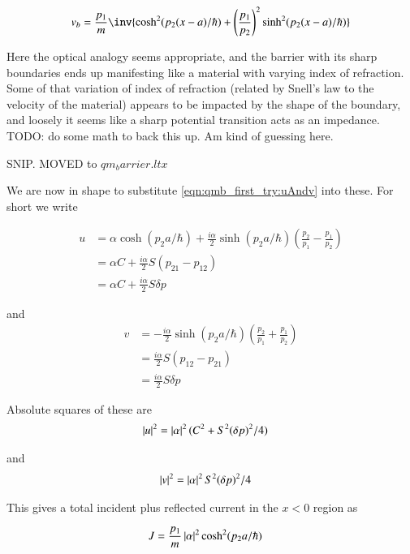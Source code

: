 \begin{align*}
v_b = \frac{p_1}{m} \inv{
\cosh^2(p_2(x-a)/\hbar)
 + 
 {\left(\frac{p_1}{p_2}\right)}^2
\sinh^2(p_2(x-a)/\hbar)
 } \\
\end{align*}

Here the optical analogy seems appropriate, and the barrier with its sharp
boundaries ends up manifesting like a material with varying index of
refraction.  Some of that variation of index of refraction (related by Snell's
law to the velocity of the material) appears to be impacted by the shape of
the boundary, and loosely it seems like a sharp potential transition acts
as an impedance.  TODO: do some math to back this up.  Am kind of guessing
here.

SNIP.  MOVED to $qm_barrier.ltx$

We are now in shape to substitute \ref{eqn:qmb_first_try:uAndv} into these.  For short we
write

\begin{align*}
u 
&= \alpha \cosh( p_2 a/\hbar )  + \frac{i\alpha}{2} \sinh( p_2 a /\hbar ) \left( \frac{p_2}{p_1} -  \frac{p_1}{p_2} \right) \\
&= \alpha C + \frac{i\alpha}{2} S \left( p_{21} - p_{12} \right) \\
&= \alpha C + \frac{i\alpha}{2} S \delta p
\end{align*}

and
\begin{align*}
v 
&= - \frac{i\alpha}{2} \sinh( p_2 a /\hbar ) \left( \frac{p_2}{p_1} + \frac{p_1}{p_2} \right) \\
&= \frac{i\alpha}{2} S \left( p_{12} - p_{21} \right) \\
&= \frac{i\alpha}{2} S \delta p
\end{align*}

Absolute squares of these are
\begin{align*}
\left\lvert{u}\right\rvert^2 &= \left\lvert{\alpha}\right\rvert^2 (C^2 + S^2 (\delta p)^2/4)
\end{align*}

and
\begin{align*}
\left\lvert{v}\right\rvert^2 &= \left\lvert{\alpha}\right\rvert^2 S^2 (\delta p)^2/4
\end{align*}

This gives a total incident plus reflected current in the $x<0$ region as

\begin{align}\label{eqn:qmb_first_try:jTotBarrier}
J 
&=
\frac{p_1}{m} \left\lvert{\alpha}\right\rvert^2 \cosh^2(p_2 a/\hbar)
\end{align}

